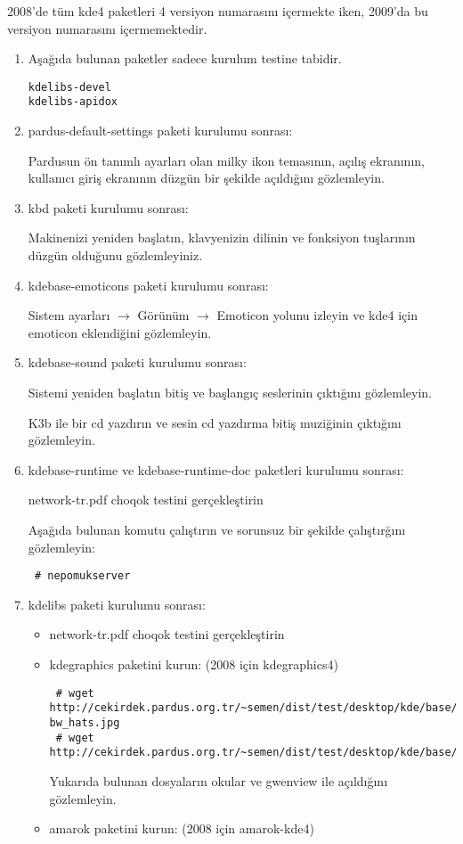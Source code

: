 \documentclass[a4paper,10pt]{article}
\begin{document}
2008'de tüm kde4 paketleri 4 versiyon numarasını içermekte iken, 2009'da bu versiyon numarasını içermemektedir.
\begin{enumerate} 
\item  Aşağıda bulunan paketler sadece kurulum testine tabidir.
\begin{verbatim}
kdelibs-devel
kdelibs-apidox 
\end{verbatim}
\item pardus-default-settings paketi kurulumu sonrası:

Pardusun ön tanımlı ayarları olan milky ikon temasının, açılış ekranının, kullanıcı giriş ekranının düzgün bir şekilde açıldığını gözlemleyin.

\item kbd paketi kurulumu sonrası:

Makinenizi yeniden başlatın, klavyenizin dilinin ve fonksiyon tuşlarının düzgün olduğunu gözlemleyiniz. 
\item kdebase-emoticons paketi kurulumu sonrası:

Sistem ayarları $\rightarrow$ Görünüm $\rightarrow$ Emoticon yolunu izleyin ve kde4 için emoticon eklendiğini gözlemleyin.
\item kdebase-sound paketi kurulumu sonrası:

Sistemi yeniden başlatın bitiş ve başlangıç seslerinin çıktığını gözlemleyin.

K3b ile bir cd yazdırın ve sesin cd yazdırma bitiş muziğinin çıktığını gözlemleyin.
\item kdebase-runtime ve kdebase-runtime-doc paketleri kurulumu sonrası:

network-tr.pdf choqok testini gerçekleştirin

Aşağıda bulunan komutu çalıştırın ve sorunsuz bir şekilde çalıştırğını gözlemleyin:
\begin{verbatim}
 # nepomukserver
\end{verbatim}

 \item kdelibs paketi kurulumu sonrası:
\begin{itemize}
 \item network-tr.pdf choqok testini gerçekleştirin


 \item kdegraphics paketini kurun: (2008 için kdegraphics4)
\begin{verbatim}
 # wget http://cekirdek.pardus.org.tr/~semen/dist/test/desktop/kde/base/circus-bw_hats.jpg
 # wget http://cekirdek.pardus.org.tr/~semen/dist/test/desktop/kde/base/tepecik_01.png
\end{verbatim}
Yukarıda bulunan dosyaların okular ve gwenview ile açıldığını gözlemleyin.
\item amarok paketini kurun: (2008 için amarok-kde4) 


\end{itemize}
\end{enumerate}
\end{document}
